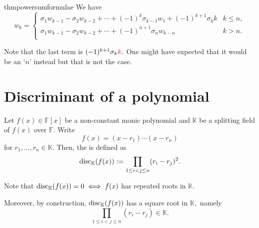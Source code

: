 \begin{restatable}{thm}{powersumformulae}
\label{thm:powersumformulae}
    We have
    \begin{equation} \label{eq:newident}
        w_k = \begin{cases}
            \sigma_1 w_{k - 1} - \sigma_2w_{k - 2} + \cdots + (-1)^k \sigma_{k - 1}w_1 + (-1)^{k + 1}\sigma_k k & k \le n,\\
            \sigma_1 w_{k - 1} - \sigma_2w_{k - 2} + \cdots + (-1)^{n + 1} \sigma_{n}w_{k - n} & k > n.\\
                
        \end{cases}
    \end{equation} 
    \hfill\hyperref[thm:powersumformulae2]{\downsym}
\end{restatable}

Note that the last term is $(-1)^{k + 1} \sigma_k {\color{red}k}.$ One might have expected that it would be an `$n$' instead but that is not the case.

\section{Discriminant of a polynomial}

\begin{defn}%
    Let $f(x) \in \mathbb{F}[x]$ be a non-constant monic polynomial and $\mathbb{K}$ be a splitting field of $f(x)$ over $\mathbb{F}.$ Write
    \begin{equation*} 
        f(x) = (x - r_1) \cdots (x - r_n)
    \end{equation*}
    for $r_1, \ldots, r_n \in \mathbb{K}.$ Then, the  is defined as
    \begin{equation*} 
        \operatorname{disc}_{\mathbb{K}}(f(x)) \vcentcolon= \prod_{1 \le i < j \le n} (r_i - r_j)^2.
    \end{equation*}
\end{defn}

\begin{rem} \label{rem:discrepeatedroots}
    Note that $\operatorname{disc}_{\mathbb{K}}(f(x)) = 0 \iff f(x)$ has repeated roots in $\mathbb{K}.$

    Moreover, by construction, $\operatorname{disc}_{\mathbb{K}}(f(x))$ has a square root in $\mathbb{K},$ namely
    \begin{equation*} 
        \prod_{1 \le i < j \le n} (r_i - r_j) \in \mathbb{K}.
    \end{equation*}
\end{rem}

